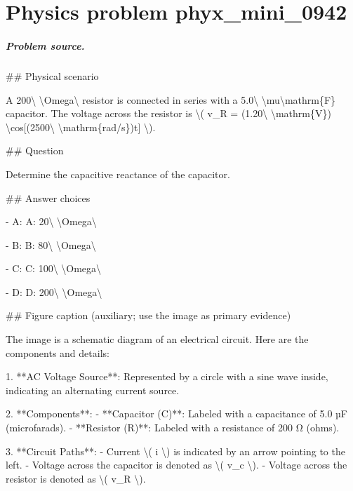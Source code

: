 
\chapter{Physics problem phyx\_mini\_0942}
\label{ch:PhyXMiniProblems_problem_phyx_mini_0942}

\paragraph{Problem source.}
\#\# Physical scenario

A 200\textbackslash{} \textbackslash{}Omega\textbackslash{} resistor is connected in series with a 5.0\textbackslash{} \textbackslash{}mu\textbackslash{}mathrm\{F\} capacitor. The voltage across the resistor is \textbackslash{}( v\_R = (1.20\textbackslash{} \textbackslash{}mathrm\{V\}) \textbackslash{}cos[(2500\textbackslash{} \textbackslash{}mathrm\{rad/s\})t] \textbackslash{}).

\#\# Question

Determine the capacitive reactance of the capacitor.

\#\# Answer choices

- A: A: 20\textbackslash{} \textbackslash{}Omega\textbackslash{}

- B: B: 80\textbackslash{} \textbackslash{}Omega\textbackslash{}

- C: C: 100\textbackslash{} \textbackslash{}Omega\textbackslash{}

- D: D: 200\textbackslash{} \textbackslash{}Omega\textbackslash{}

\#\# Figure caption (auxiliary; use the image as primary evidence)

The image is a schematic diagram of an electrical circuit. Here are the components and details:

1. **AC Voltage Source**: Represented by a circle with a sine wave inside, indicating an alternating current source.

2. **Components**:
   - **Capacitor (C)**: Labeled with a capacitance of 5.0 µF (microfarads).
   - **Resistor (R)**: Labeled with a resistance of 200 Ω (ohms).

3. **Circuit Paths**:
   - Current \textbackslash{}( i \textbackslash{}) is indicated by an arrow pointing to the left.
   - Voltage across the capacitor is denoted as \textbackslash{}( v\_c \textbackslash{}).
   - Voltage across the resistor is denoted as \textbackslash{}( v\_R \textbackslash{}).

